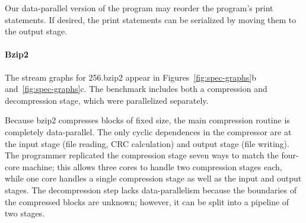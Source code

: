 Our data-parallel version of the program may reorder the program's
print statements.  If desired, the print statements can be serialized
by moving them to the output stage.


\paragraph*{Bzip2} The stream graphs for 256.bzip2 appear in
Figures~\ref{fig:spec-graphs}b and~\ref{fig:spec-graphs}c.  The
benchmark includes both a compression and decompression stage, which
were parallelized separately.


Because bzip2 compresses blocks of fixed size, the main compression
routine is completely data-parallel.  The only cyclic dependences in
the compressor are at the input stage (file reading, CRC calculation)
and output stage (file writing).  The programmer replicated the
compression stage seven ways to match the four-core machine; this
allows three cores to handle two compression stages each, while one
core handles a single compression stage as well as the input and
output stages.  The decompression step lacks data-parallelism because
the boundaries of the compressed blocks are unknown; however, it can
be split into a pipeline of two stages.

